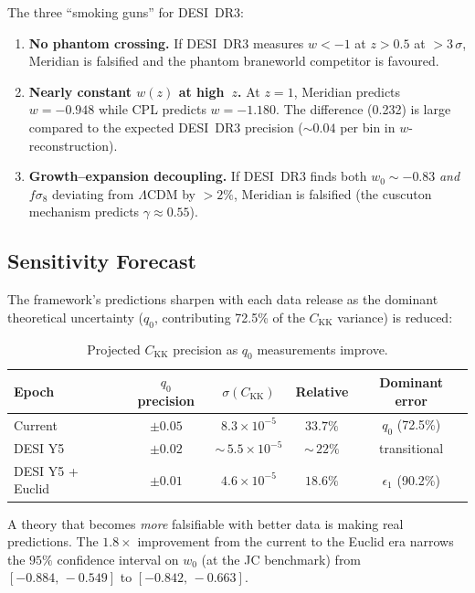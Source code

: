 The three ``smoking guns'' for DESI~DR3:
\begin{enumerate}
\item \textbf{No phantom crossing.} If DESI~DR3 measures $w < -1$ at $z > 0.5$ at $> 3\,\sigma$, Meridian is falsified and the phantom braneworld competitor is favoured.
\item \textbf{Nearly constant $w(z)$ at high~$z$.} At $z = 1$, Meridian predicts $w = -0.948$ while CPL predicts $w = -1.180$. The difference (0.232) is large compared to the expected DESI~DR3 precision ($\sim\!0.04$ per bin in $w$-reconstruction).
\item \textbf{Growth--expansion decoupling.} If DESI~DR3 finds both $w_0 \sim -0.83$ \emph{and} $f\sigma_8$ deviating from $\Lambda$CDM by $> 2\%$, Meridian is falsified (the cuscuton mechanism predicts $\gamma \approx 0.55$).
\end{enumerate}

\subsection{Sensitivity Forecast}
\label{sec:2-sensitivity-forecast}

The framework's predictions sharpen with each data release as the dominant theoretical uncertainty ($q_0$, contributing 72.5\% of the $C_\mathrm{KK}$ variance) is reduced:

\begin{table}[htbp]
\centering
\caption{Projected $C_\mathrm{KK}$ precision as $q_0$ measurements improve.}
\label{tab:2-sensitivity}
\begin{tabular}{@{}lcccc@{}}
\toprule
Epoch & $q_0$ precision & $\sigma(C_\mathrm{KK})$ & Relative & Dominant error \\
\midrule
Current & $\pm 0.05$ & $8.3 \times 10^{-5}$ & $33.7\%$ & $q_0$ (72.5\%) \\
DESI Y5 & $\pm 0.02$ & ${\sim}\,5.5 \times 10^{-5}$ & ${\sim}\,22\%$ & transitional \\
DESI Y5 + Euclid & $\pm 0.01$ & $4.6 \times 10^{-5}$ & $18.6\%$ & $\epsilon_1$ (90.2\%) \\
\bottomrule
\end{tabular}
\end{table}

A theory that becomes \emph{more} falsifiable with better data is making real predictions. The $1.8\times$ improvement from the current to the Euclid era narrows the $95\%$ confidence interval on $w_0$ (at the JC benchmark) from $[-0.884,\, -0.549]$ to $[-0.842,\, -0.663]$.

